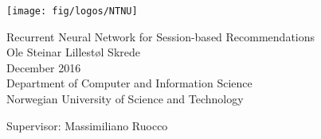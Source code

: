 
\thispagestyle{empty}
\texttt{[image: fig/logos/NTNU]}
\mbox{}\\[6pc]
\begin{center}
\Huge{Recurrent Neural Network for Session-based Recommendations}\\[2pc]

\Large{Ole Steinar Lillestøl Skrede}\\[1pc]
\large{December 2016}\\[2pc]

Department of Computer and Information Science\\
Norwegian University of Science and Technology
\end{center}
\vfill

\noindent Supervisor: Massimiliano Ruocco

